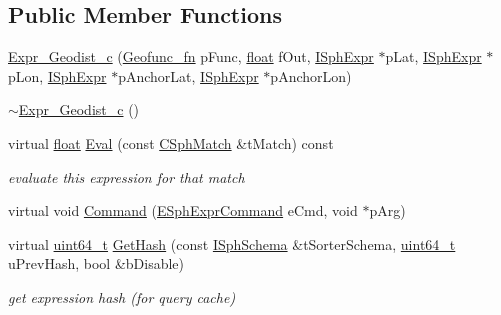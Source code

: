 \subsection*{Public Member Functions}
\begin{DoxyCompactItemize}
\item 
\hyperlink{classExpr__Geodist__c_abac332ae9c1bb1fc36bbb155838bb622}{Expr\-\_\-\-Geodist\-\_\-c} (\hyperlink{sphinxexpr_8cpp_a162dd05806302c01435e9c554f017be4}{Geofunc\-\_\-fn} p\-Func, \hyperlink{sphinxexpr_8cpp_a0e0d0739f7035f18f949c2db2c6759ec}{float} f\-Out, \hyperlink{structISphExpr}{I\-Sph\-Expr} $\ast$p\-Lat, \hyperlink{structISphExpr}{I\-Sph\-Expr} $\ast$p\-Lon, \hyperlink{structISphExpr}{I\-Sph\-Expr} $\ast$p\-Anchor\-Lat, \hyperlink{structISphExpr}{I\-Sph\-Expr} $\ast$p\-Anchor\-Lon)
\item 
\hyperlink{classExpr__Geodist__c_a090234cf714561751d378131457741f4}{$\sim$\-Expr\-\_\-\-Geodist\-\_\-c} ()
\item 
virtual \hyperlink{sphinxexpr_8cpp_a0e0d0739f7035f18f949c2db2c6759ec}{float} \hyperlink{classExpr__Geodist__c_a678b42849ffda95f6ef924b2e59b2749}{Eval} (const \hyperlink{classCSphMatch}{C\-Sph\-Match} \&t\-Match) const 
\begin{DoxyCompactList}\small\item\em evaluate this expression for that match \end{DoxyCompactList}\item 
virtual void \hyperlink{classExpr__Geodist__c_aeb74aa19ac51a43d41c06f6bbbdc256a}{Command} (\hyperlink{sphinxexpr_8h_a30be184fb07bd80c271360fc6094c818}{E\-Sph\-Expr\-Command} e\-Cmd, void $\ast$p\-Arg)
\item 
virtual \hyperlink{sphinxstd_8h_aaa5d1cd013383c889537491c3cfd9aad}{uint64\-\_\-t} \hyperlink{classExpr__Geodist__c_a2b1d2d6de9a86063405c5abd2b98477a}{Get\-Hash} (const \hyperlink{classISphSchema}{I\-Sph\-Schema} \&t\-Sorter\-Schema, \hyperlink{sphinxstd_8h_aaa5d1cd013383c889537491c3cfd9aad}{uint64\-\_\-t} u\-Prev\-Hash, bool \&b\-Disable)
\begin{DoxyCompactList}\small\item\em get expression hash (for query cache) \end{DoxyCompactList}\end{DoxyCompactItemize}
